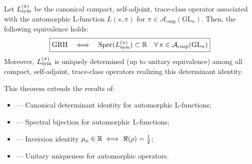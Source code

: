 \begin{theorem}
\label{thm:grh_spectral_closure}

Let \( L_{\mathrm{sym}}^{(\pi)} \) be the canonical compact, self-adjoint, trace-class operator associated with the automorphic L-function \( L(s, \pi) \) for \( \pi \in \mathcal{A}_{\text{cusp}}(\mathrm{GL}_n) \). Then, the following equivalence holds:
\[
\boxed{
\text{GRH} \quad \Longleftrightarrow \quad \operatorname{Spec}(L_{\mathrm{sym}}^{(\pi)}) \subset \mathbb{R} \quad \forall \, \pi \in \mathcal{A}_{\text{cusp}}(\mathrm{GL}_n)
}
\]
Moreover, \( L_{\mathrm{sym}}^{(\pi)} \) is uniquely determined (up to unitary equivalence) among all compact, self-adjoint, trace-class operators realizing this determinant identity.

\medskip

\noindent
This theorem extends the results of:
\begin{itemize}
  \item {} — Canonical determinant identity for automorphic L-functions;
  \item {} — Spectral bijection for automorphic L-functions;
  \item {} — Inversion identity \(\mu_\rho \in \mathbb{R} \iff \Re(\rho) = \tfrac{1}{2}\);
  \item {} — Unitary uniqueness for automorphic operators.
\end{itemize}
\end{theorem}
